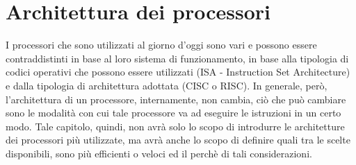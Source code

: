 \chapter{Architettura dei processori}
I processori che sono utilizzati al giorno d'oggi sono vari e possono essere contraddistinti in base al loro sistema di funzionamento, in base alla tipologia di codici operativi che possono essere utilizzati (ISA - Instruction Set Architecture) e dalla tipologia di architettura adottata (CISC o RISC). 
In generale, però, l'architettura di un processore, internamente, non cambia, ciò che può cambiare sono le modalità con cui tale processore va ad eseguire le istruzioni in un certo modo. Tale capitolo, quindi, non avrà solo lo scopo di introdurre le architetture dei processori più utilizzate, ma avrà anche lo scopo di definire quali tra le scelte disponibili, sono più efficienti o veloci ed il perchè di tali considerazioni.




